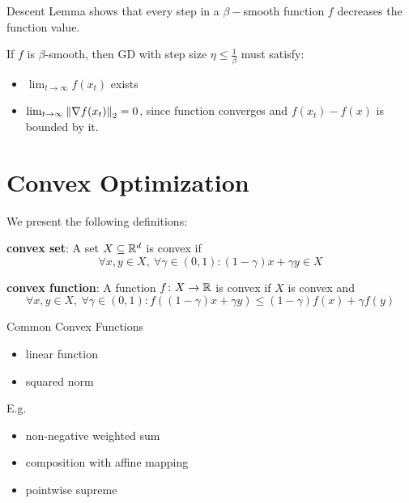 \begin{remark}
    Descent Lemma shows that every step in a \(\beta-\)smooth function \(f\) decreases 
    the function value. 
\end{remark}


\begin{corollary}
    If \(f\) is \(\beta\)-smooth, then GD with step size \(\eta \leq \frac{1}{\beta}\) must 
    satisfy: 
    \begin{itemize}
        \item \(\lim_{t \to \infty} f(x_t)\) exists 
        \item \(\lim_{t \to \infty} \norm{\nabla f(x_t)}_2 = 0\), since function converges and 
        \(f(x_t) - f(x)\) is bounded by it. 
    \end{itemize}
\end{corollary}

\section{Convex Optimization}

\begin{definition}[convexity] We present the following definitions: 
    
    \textbf{convex set}: A set \(X \subseteq \mathbb{R}^d\) is convex if 
    \[
        \forall x, y \in X, \ \forall \gamma \in (0,1) \colon (1 - \gamma)x + \gamma y \in X   
    \]

    \textbf{convex function}: A function \(f \colon X \to \mathbb{R}\) is convex if \(X\) is convex 
    and 
    \[
        \forall x, y \in X, \ \forall \gamma \in (0,1) \colon 
        f \left((1 - \gamma)x + \gamma y\right) \leq (1 - \gamma) f(x) + \gamma f(y)
    \]
\end{definition}

\begin{eg} Common Convex Functions 

    \begin{itemize}
        \item linear function 
        \item squared norm
    \end{itemize}
    
\end{eg}

\begin{eg} E.g. 


    \begin{itemize}
        \item non-negative weighted sum 
        \item composition with affine mapping 
        \item pointwise supreme 
    \end{itemize}
\end{eg}



